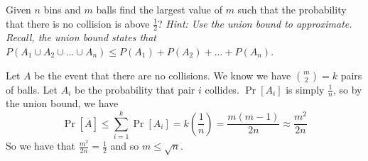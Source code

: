 \question 
Given $n$ bins and $m$ balls find the largest value of $m$ such that the probability that there is no collision is above $\frac{1}{2}$? \textit{Hint: Use the union bound to approximate. Recall, the union bound states that $P(A_1 \cup A_2 \cup ... \cup A_n) \leq P(A_1) + P(A_2) + ... + P(A_n)$}.
    \begin{solution}[1 cm] Let $A$ be the event that there are no collisions. We know we have $\binom{m}{2} = k$ pairs of balls. Let $A_i$ be the probability that pair $i$ collides. $\Pr[A_i]$ is simply $\frac{1}{n}$, so by the union bound, we have 
    \[\Pr[\overline{A}] \leq \sum_{i=1}^{k} \Pr[A_i] = k \left(\frac{1}{n}\right) = \frac{m(m-1)}{2n}\approx \frac{m^2}{2n}\]
    So we have that $\frac{m^2}{2n} = \frac{1}{2}$ and so $m \leq \sqrt{n}$. 
\end{solution} 